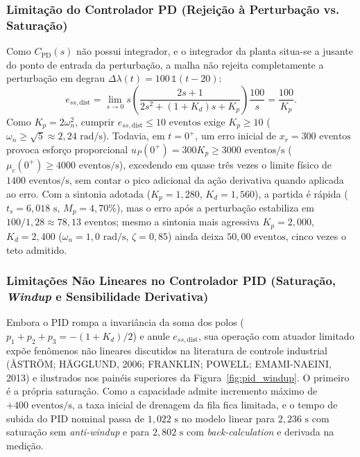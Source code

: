 \subsubsection{Limitação do Controlador PD (Rejeição à Perturbação vs. Saturação)}
Como $C_{\text{PD}}(s)$ não possui integrador, e o integrador da planta situa-se a jusante do ponto de entrada da perturbação, a malha não rejeita completamente a perturbação em degrau $\Delta\lambda(t) = 100\,\mathbb{1}(t - 20)$:
\begin{equation}
    e_{ss,\text{dist}} = \lim_{s\to 0} s\left(\frac{2s+1}{2s^2 + (1+K_d)s + K_p}\right)\frac{100}{s} = \frac{100}{K_p}.
\end{equation}
Como $K_p = 2\omega_n^2$, cumprir $e_{ss,\text{dist}} \le 10\text{ eventos}$ exige $K_p \ge 10$ ($\omega_n \ge \sqrt{5} \approx 2{,}24\text{ rad/s}$). Todavia, em $t = 0^+$, um erro inicial de $x_r = 300\text{ eventos}$ provoca esforço proporcional $u_P(0^+) = 300 K_p \ge 3000\text{ eventos/s}$ ($\mu_c(0^+) \ge 4000\text{ eventos/s}$), excedendo em quase três vezes o limite físico de $1400\text{ eventos/s}$, sem contar o pico adicional da ação derivativa quando aplicada ao erro. Com a sintonia adotada ($K_p = 1{,}280$, $K_d = 1{,}560$), a partida é rápida ($t_s = 6{,}018\text{ s}$, $M_p = 4{,}70\%$), mas o erro após a perturbação estabiliza em $100/1{,}28 \approx 78{,}13\text{ eventos}$; mesmo a sintonia mais agressiva $K_p = 2{,}000$, $K_d = 2{,}400$ ($\omega_n = 1{,}0\text{ rad/s}$, $\zeta = 0{,}85$) ainda deixa $50{,}00\text{ eventos}$, cinco vezes o teto admitido.

\subsubsection[Limitações Não Lineares no Controlador PID]{Limitações Não Lineares no Controlador PID (Saturação, \textit{Windup} e Sensibilidade Derivativa)}
Embora o PID rompa a invariância da soma dos polos ($p_1+p_2+p_3 = -(1+K_d)/2$) e anule $e_{ss,\text{dist}}$, sua operação com atuador limitado expõe fenômenos não lineares discutidos na literatura de controle industrial (ÅSTRÖM; HÄGGLUND, 2006; FRANKLIN; POWELL; EMAMI-NAEINI, 2013) e ilustrados nos painéis superiores da Figura~\ref{fig:pid_windup}. O primeiro é a própria saturação. Como a capacidade admite incremento máximo de $+400\text{ eventos/s}$, a taxa inicial de drenagem da fila fica limitada, e o tempo de subida do PID nominal passa de $1{,}022\text{ s}$ no modelo linear para $2{,}236\text{ s}$ com saturação sem \textit{anti-windup} e para $2{,}802\text{ s}$ com \textit{back-calculation} e derivada na medição.

